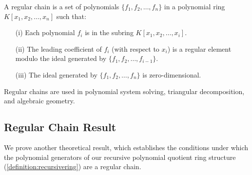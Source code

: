 \documentclass[12pt,reqno]{article}
\theoremstyle{plain}
\begin{document}
A regular chain is a set of polynomials $\{f_1, f_2, \ldots, f_n\}$ in a polynomial ring \\ $K[x_1, x_2, \ldots, x_n]$ such that:
\begin{enumerate}
    \item[(i)] Each polynomial $f_i$ is in the subring $K[x_1, x_2, \ldots, x_i]$.
    \item[(ii)] The leading coefficient of $f_i$ (with respect to $x_i$) is a regular element modulo the ideal generated by $\{f_1, f_2, \ldots, f_{i-1}\}$.
    \item[(iii)] The ideal generated by $\{f_1, f_2, \ldots, f_n\}$ is zero-dimensional.
\end{enumerate}
Regular chains are used in polynomial system solving, triangular decomposition, and algebraic geometry.

\subsection{Regular Chain Result}
We prove another theoretical result, which establishes the conditions under which the polynomial generators of our recursive polynomial quotient ring structure (\cref{definition:recursivering}) are a regular chain.
\end{document}
